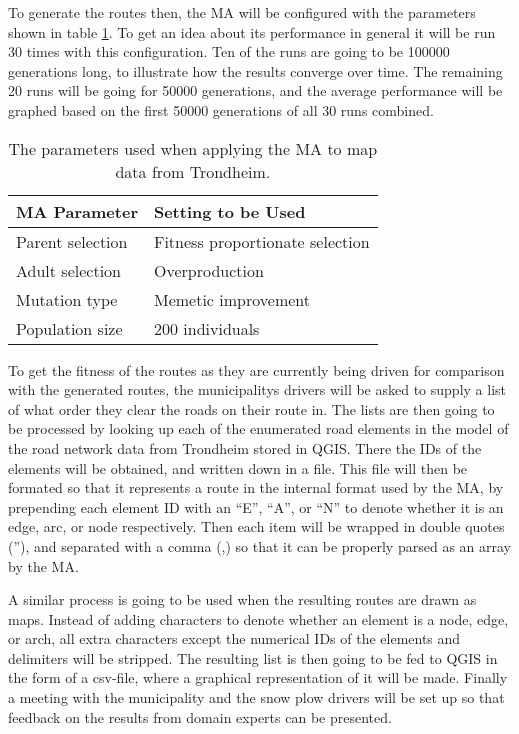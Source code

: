 To generate the routes then, the MA will be configured with the parameters shown in table \ref{tab:trondheim_params_table}. To get an idea about its performance in general it will be run 30 times with this configuration. Ten of the runs are going to be 100000 generations long, to illustrate how the results converge over time. The remaining 20 runs will be going for 50000 generations, and the average performance will be graphed based on the first 50000 generations of all 30 runs combined.

{
\begin{table}[tbph]
\centering
\begin{tabular}{ll}
\toprule
\textbf{MA Parameter} & \textbf{Setting to be Used}     \\ \midrule
Parent selection      & Fitness proportionate selection \\
Adult selection       & Overproduction                  \\
Mutation type         & Memetic improvement             \\
Population size       & 200 individuals                  \\ \bottomrule
\end{tabular}
\caption{The parameters used when applying the MA to map data from Trondheim.}
\label{tab:trondheim_params_table}
\end{table}
}

To get the fitness of the routes as they are currently being driven for comparison with the generated routes, the municipalitys drivers will be asked to supply a list of what order they clear the roads on their route in. The lists are then going to be processed by looking up each of the enumerated road elements in the model of the road network data from Trondheim stored in QGIS. There the IDs of the elements will be obtained, and written down in a file. This file will then be formated so that it represents a route in the internal format used by the MA, by prepending each element ID with an \enquote{E}, \enquote{A}, or \enquote{N} to denote whether it is an edge, arc, or node respectively. Then each item will be wrapped in double quotes (''), and separated with a comma (,) so that it can be properly parsed as an array by the MA.

A similar process is going to be used when the resulting routes are drawn as maps. Instead of adding characters to denote whether an element is a node, edge, or arch, all extra characters except the numerical IDs of the elements and delimiters will be stripped. The resulting list is then going to be fed to QGIS in the form of a csv-file, where a graphical representation of it will be made. Finally a meeting with the municipality and the snow plow drivers will be set up so that feedback on the results from domain experts can be presented.

